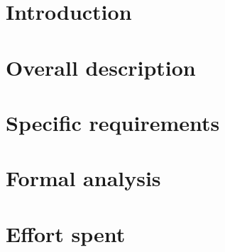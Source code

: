\documentclass{article}
\begin{document}
\tableofcontents

\newpage

\section{Introduction}


\newpage

\section{Overall description}


\newpage

\section{Specific requirements}



\newpage

\section{Formal analysis}

\newpage

\section{Effort spent}

\end{document}
